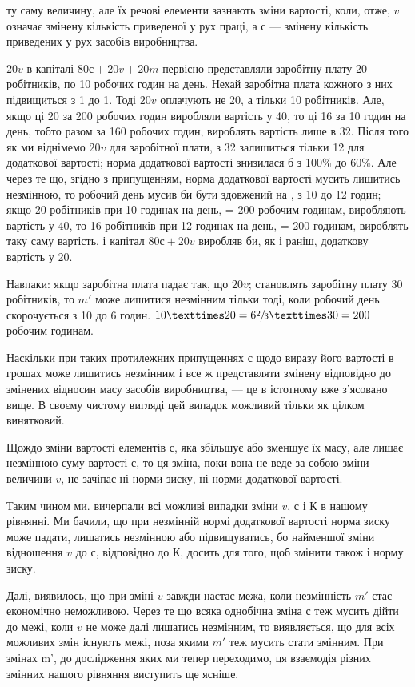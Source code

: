 \parcont{}  %
ту саму величину, але їх речові елементи зазнають зміни вартості,
коли, отже, $v$ означає змінену кількість приведеної у рух
праці, а $с$ — змінену кількість приведених у рух засобів виробництва.

$20v$ в капіталі $80с + 20v + 20m$ первісно представляли заробітну
плату 20 робітників, по 10 робочих годин на день. Нехай
заробітна плата кожного з них підвищиться з 1 до 1. Тоді $20v$
оплачують не 20, а тільки 10 робітників. Але, якщо ці 20 за
200 робочих годин виробляли вартість у 40, то ці 16 за 10 годин
на день, тобто разом за 160 робочих годин, вироблять вартість
лише в 32. Після того як ми віднімемо $20v$ для заробітної
плати, з 32 залишиться тільки 12 для додаткової вартості; норма
додаткової вартості знизилася б з 100\% до 60\%. Але через
те що, згідно з припущенням, норма додаткової вартості мусить
лишитись незмінною, то робочий день мусив би бути здовжений
на , з 10 до 12 годин; якщо 20 робітників при 10 годинах
на день, = 200 робочим годинам, виробляють вартість у 40, то
16 робітників при 12 годинах на день, = 200 годинам, вироблять
таку саму вартість, і капітал $80с + 20v$ виробляв би, як і раніш,
додаткову вартість у 20.

Навпаки: якщо заробітна плата падає так, що $20v$; становлять
заробітну плату 30 робітників, то $m'$ може лишитися
незмінним тільки тоді, коли робочий день скорочується з 10
до 6 годин. $10 × 20 = 6\sfrac{2}{3} × 30 = 200$ робочим годинам.

Наскільки при таких протилежних припущеннях с щодо виразу
його вартості в грошах може лишитись незмінним і все ж
представляти змінену відповідно до змінених відносин масу
засобів виробництва, — це в істотному вже з’ясовано вище.
В своєму чистому вигляді цей випадок можливий тільки як цілком
винятковий.

Щождо зміни вартості елементів $с$, яка збільшує або зменшує
їх масу, але лишає незмінною суму вартості $с$, то ця зміна, поки
вона не веде за собою зміни величини $v$, не зачіпає ні норми
зиску, ні норми додаткової вартості.

Таким чином ми. вичерпали всі можливі випадки зміни $v$, $с$
і $К$ в нашому рівнянні. Ми бачили, що при незмінній нормі додаткової
вартості норма зиску може падати, лишатись незмінною
або підвищуватись, бо найменшої зміни відношення $v$ до $с$,
відповідно до $К$, досить для того, щоб змінити також і норму
зиску.

Далі, виявилось, що при зміні $v$ завжди настає межа, коли незмінність
$m'$ стає економічно неможливою. Через те що всяка
однобічна зміна $с$ теж мусить дійти до межі, коли $v$ не може
далі лишатись незмінним, то виявляється, що для всіх можливих
змін  існують межі, поза якими $m'$ теж мусить стати змінним.
При змінах m', до дослідження яких ми тепер переходимо, ця
взаємодія різних змінних нашого рівняння виступить ще ясніше.
